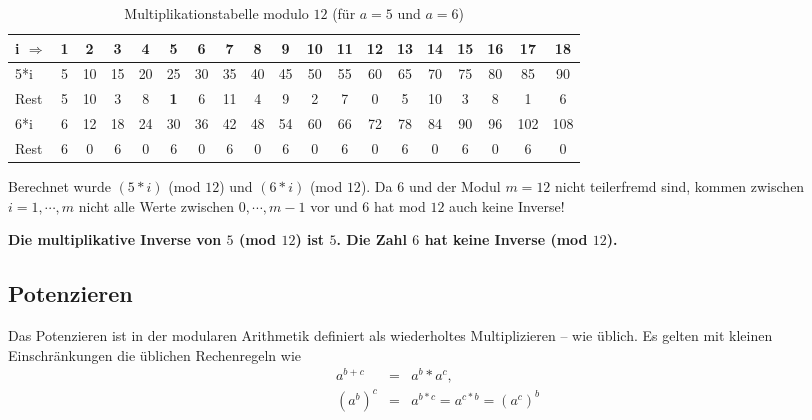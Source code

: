 \begin{refsegment}
\begin{table}[ht]
\begin{center}                                                                  \begin{tabular}{|l@{\:}||c|c|c|c|c|c|c|c|c|c|c||c|c|c|c|c|c|c|}
\hline
i $\Rightarrow$      & 1  & 2  & 3  & 4  & 5  & 6  & 7  & 8  & 9 & 10 & 11 & 12 & 13 & 14 & 15 & 16  & 17  & 18\\
\hline
\hline
5*i                  & 5 & 10 & 15 & 20 & 25 & 30 & 35 & 40 & 45 & 50 & 55 & 60 & 65 & 70 & 75 & 80  & 85  & 90\\
Rest                 & 5 & 10  & 3  & 8  & \textbf{1}  & 6 & 11  & 4  & 9  & 2  & 7  & 0  & 5 & 10  & 3  & 8   & 1   & 6\\
\hline
6*i                  & 6 & 12 & 18 & 24 & 30 & 36 & 42 & 48 & 54 & 60 & 66 & 72 & 78 & 84 & 90 & 96 & 102 & 108\\
Rest                 & 6  & 0  & 6  & 0  & 6  & 0  & 6  & 0  & 6  & 0  & 6  & 0  & 6  & 0  & 6  & 0   & 6   & 0\\
\hline
\end{tabular}
\end{center}
\caption{Multiplikationstabelle modulo $12$ (für $a=5$ und $a=6$)}
\label{mulmod12}
\end{table}

Berechnet wurde $(5 * i)$ (mod $12$) und $(6*i)$ (mod $12$).
Da $6$ und der Modul $m=12$ nicht teilerfremd
sind, kommen zwischen $i=1, \cdots, m$ nicht alle Werte zwischen
$0, \cdots, m-1$ vor und $6$ hat mod $12$ auch keine Inverse!
 

\textbf{Die multiplikative Inverse von $5$ (mod $12$)
ist $5$. Die Zahl $6$ hat keine Inverse (mod $12$). }



\subsection{Potenzieren}
Das Potenzieren ist in der modularen Arithmetik definiert als wiederholtes
Multiplizieren -- wie üblich.
Es gelten mit kleinen Einschränkungen die üblichen Rechenregeln wie
\begin{eqnarray*}
a^{b+c} & = & a^b * a^c,  \nonumber\\
(a^b)^c & = & a^{b*c} = a^{c*b} = (a^c)^b \nonumber
\end{eqnarray*}



\end{refsegment}
